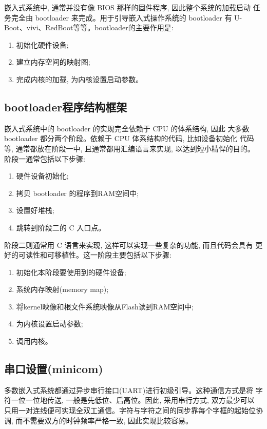 嵌入式系统中, 通常并没有像 BIOS 那样的固件程序, 因此整个系统的加载启动
任务完全由 bootloader 来完成。用于引导嵌入式操作系统的 bootloader 有
U-Boot、vivi、RedBoot等等。bootloader的主要作用是:
\begin{enumerate}
    \item 初始化硬件设备;
    \item 建立内存空间的映射图;
    \item 完成内核的加载, 为内核设置启动参数。
\end{enumerate}

\subsection{bootloader程序结构框架}
嵌入式系统中的 bootloader 的实现完全依赖于 CPU 的体系结构, 因此
大多数 bootloader 都分两个阶段。依赖于 CPU 体系结构的代码, 比如设备初始化
代码等, 通常都放在阶段一中, 且通常都用汇编语言来实现, 以达到短小精悍的目的。
阶段一通常包括以下步骤:
\begin{enumerate}
    \item 硬件设备初始化;
    \item 拷贝 bootloader 的程序到RAM空间中;
    \item 设置好堆栈;
    \item 跳转到阶段二的 C 入口点。
\end{enumerate}

阶段二则通常用 C 语言来实现, 这样可以实现一些复杂的功能, 而且代码会具有
更好的可读性和可移植性。这一阶段主要包括以下步骤:
\begin{enumerate}
    \item 初始化本阶段要使用到的硬件设备;
    \item 系统内存映射(memory map);
    \item 将kernel映像和根文件系统映像从Flash读到RAM空间中;  
    \item 为内核设置启动参数;
    \item 调用内核。
\end{enumerate}

\subsection{串口设置(minicom)}
   多数嵌入式系统都通过异步串行接口(UART)进行初级引导。这种通信方式是将
字符一位一位地传送, 一般是先低位、后高位。因此, 采用串行方式, 双方最少可以
只用一对连线便可实现全双工通信。字符与字符之间的同步靠每个字框的起始位协调,
而不需要双方的时钟频率严格一致, 因此实现比较容易。

